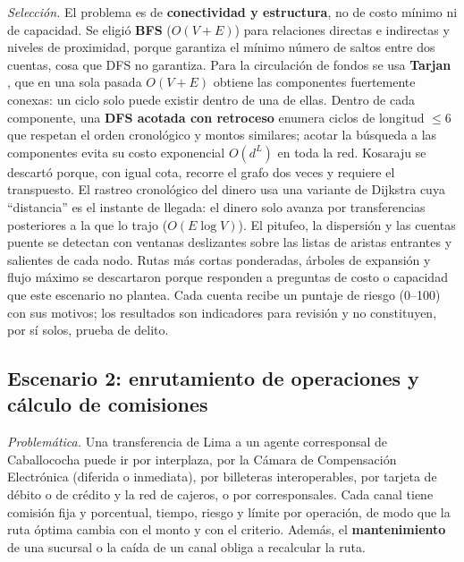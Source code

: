 \documentclass[11pt,a4paper]{article}
\begin{document}
\textit{Selección.} El problema es de \textbf{conectividad y estructura}, no de costo mínimo ni de capacidad. Se
eligió \textbf{BFS} ($O(V+E)$) para relaciones directas e indirectas y niveles de proximidad, porque garantiza el
mínimo número de saltos entre dos cuentas, cosa que DFS no garantiza. Para la circulación de fondos se usa
\textbf{Tarjan} \citep{tarjan1972}, que en una sola pasada $O(V+E)$ obtiene las componentes fuertemente conexas: un
ciclo solo puede existir dentro de una de ellas. Dentro de cada componente, una \textbf{DFS acotada con
retroceso} enumera ciclos de longitud $\le 6$ que respetan el orden cronológico y montos similares; acotar la
búsqueda a las componentes evita su costo exponencial $O(d^{L})$ en toda la red. Kosaraju se descartó porque, con
igual cota, recorre el grafo dos veces y requiere el transpuesto. El rastreo cronológico del dinero usa una variante de
Dijkstra cuya “distancia” es el instante de llegada: el dinero solo avanza por transferencias posteriores a la que
lo trajo ($O(E\log V)$). El pitufeo, la dispersión y las cuentas puente se detectan con ventanas deslizantes sobre
las listas de aristas entrantes y salientes de cada nodo. Rutas más cortas ponderadas, árboles de expansión y flujo
máximo se descartaron porque responden a preguntas de costo o capacidad que este escenario no plantea. Cada cuenta
recibe un puntaje de riesgo (0–100) con sus motivos; los resultados son indicadores para revisión y no constituyen,
por sí solos, prueba de delito.

\subsection{Escenario 2: enrutamiento de operaciones y cálculo de comisiones}
\textit{Problemática.} Una transferencia de Lima a un agente corresponsal de Caballococha puede ir por interplaza,
por la Cámara de Compensación Electrónica (diferida o inmediata), por billeteras interoperables, por tarjeta de débito
o de crédito y la red de cajeros, o por corresponsales. Cada canal tiene comisión fija y porcentual, tiempo, riesgo y
límite por operación, de modo que la ruta óptima cambia con el monto y con el criterio. Además, el
\textbf{mantenimiento} de una sucursal o la caída de un canal obliga a recalcular la ruta.
\end{document}
